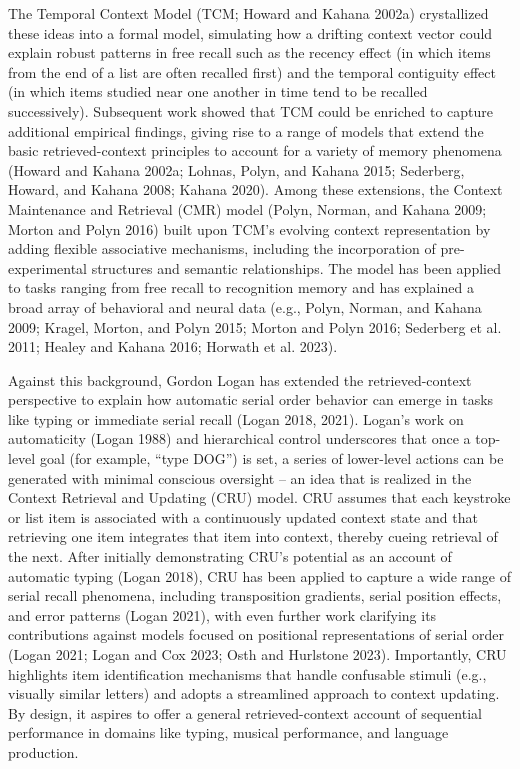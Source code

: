 \documentclass[
  letterpaper,
  11pt,
  english,
  singlespacing,
  headsepline]{MastersDoctoralThesis}
\begin{document}
The Temporal Context Model (TCM; Howard and Kahana 2002a) crystallized
these ideas into a formal model, simulating how a drifting context
vector could explain robust patterns in free recall such as the recency
effect (in which items from the end of a list are often recalled first)
and the temporal contiguity effect (in which items studied near one
another in time tend to be recalled successively). Subsequent work
showed that TCM could be enriched to capture additional empirical
findings, giving rise to a range of models that extend the basic
retrieved-context principles to account for a variety of memory
phenomena (Howard and Kahana 2002a; Lohnas, Polyn, and Kahana 2015;
Sederberg, Howard, and Kahana 2008; Kahana 2020). Among these
extensions, the Context Maintenance and Retrieval (CMR) model (Polyn,
Norman, and Kahana 2009; Morton and Polyn 2016) built upon TCM's
evolving context representation by adding flexible associative
mechanisms, including the incorporation of pre-experimental structures
and semantic relationships. The model has been applied to tasks ranging
from free recall to recognition memory and has explained a broad array
of behavioral and neural data (e.g., Polyn, Norman, and Kahana 2009;
Kragel, Morton, and Polyn 2015; Morton and Polyn 2016; Sederberg et al.
2011; Healey and Kahana 2016; Horwath et al. 2023).

Against this background, Gordon Logan has extended the retrieved-context
perspective to explain how automatic serial order behavior can emerge in
tasks like typing or immediate serial recall (Logan 2018, 2021). Logan's
work on automaticity (Logan 1988) and hierarchical control underscores
that once a top-level goal (for example, ``type DOG'') is set, a series
of lower-level actions can be generated with minimal conscious oversight
-- an idea that is realized in the Context Retrieval and Updating (CRU)
model. CRU assumes that each keystroke or list item is associated with a
continuously updated context state and that retrieving one item
integrates that item into context, thereby cueing retrieval of the next.
After initially demonstrating CRU's potential as an account of automatic
typing (Logan 2018), CRU has been applied to capture a wide range of
serial recall phenomena, including transposition gradients, serial
position effects, and error patterns (Logan 2021), with even further
work clarifying its contributions against models focused on positional
representations of serial order (Logan 2021; Logan and Cox 2023; Osth
and Hurlstone 2023). Importantly, CRU highlights item identification
mechanisms that handle confusable stimuli (e.g., visually similar
letters) and adopts a streamlined approach to context updating. By
design, it aspires to offer a general retrieved-context account of
sequential performance in domains like typing, musical performance, and
language production.
\end{document}

